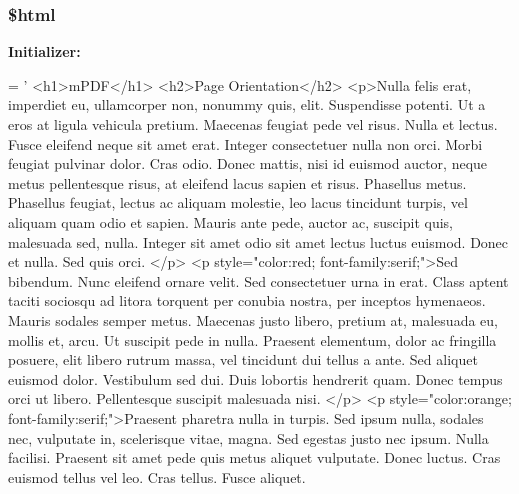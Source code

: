 \hypertarget{example24__orientation__2_8php_a6f96e7fc92441776c9d1cd3386663b40}{
\subsubsection[{\$html}]{\setlength{\rightskip}{0pt plus 5cm}\$html}}\label{example24__orientation__2_8php_a6f96e7fc92441776c9d1cd3386663b40}
{\bfseries Initializer\-:}
\begin{DoxyCode}
= \textcolor{stringliteral}{'}
\textcolor{stringliteral}{<h1>mPDF</h1>}
\textcolor{stringliteral}{<h2>Page Orientation</h2>}
\textcolor{stringliteral}{}
\textcolor{stringliteral}{<p>Nulla felis erat, imperdiet eu, ullamcorper non, nonummy quis, elit. Suspendisse potenti. Ut a eros at
       ligula vehicula pretium. Maecenas feugiat pede vel risus. Nulla et lectus. Fusce eleifend neque sit amet
       erat. Integer consectetuer nulla non orci. Morbi feugiat pulvinar dolor. Cras odio. Donec mattis, nisi id
       euismod auctor, neque metus pellentesque risus, at eleifend lacus sapien et risus. Phasellus metus. Phasellus
       feugiat, lectus ac aliquam molestie, leo lacus tincidunt turpis, vel aliquam quam odio et sapien. Mauris ante
       pede, auctor ac, suscipit quis, malesuada sed, nulla. Integer sit amet odio sit amet lectus luctus euismod.
       Donec et nulla. Sed quis orci. </p>}
\textcolor{stringliteral}{}
\textcolor{stringliteral}{}
\textcolor{stringliteral}{<p style="color:red; font-family:serif;">Sed bibendum. Nunc eleifend ornare velit. Sed consectetuer urna in
       erat. Class aptent taciti sociosqu ad litora torquent per conubia nostra, per inceptos hymenaeos. Mauris
       sodales semper metus. Maecenas justo libero, pretium at, malesuada eu, mollis et, arcu. Ut suscipit pede in
       nulla. Praesent elementum, dolor ac fringilla posuere, elit libero rutrum massa, vel tincidunt dui tellus a
       ante. Sed aliquet euismod dolor. Vestibulum sed dui. Duis lobortis hendrerit quam. Donec tempus orci ut
       libero. Pellentesque suscipit malesuada nisi. </p>}
\textcolor{stringliteral}{<p style="color:orange; font-family:serif;">Praesent pharetra nulla in turpis. Sed ipsum nulla, sodales
       nec, vulputate in, scelerisque vitae, magna. Sed egestas justo nec ipsum. Nulla facilisi. Praesent sit amet
       pede quis metus aliquet vulputate. Donec luctus. Cras euismod tellus vel leo. Cras tellus. Fusce aliquet.
}
\end{DoxyCode}
